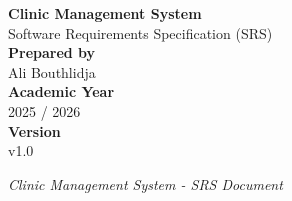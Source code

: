 \begin{titlepage}
	\centering
	
	\vspace*{2cm}
	
	{\Huge \textbf{Clinic Management System}}\\[0.5cm]
	
	{\Large Software Requirements Specification (SRS)}\\[2cm]
	
	{\large \textbf{Prepared by}}\\[0.3cm]
	Ali Bouthlidja\\[1cm]
	
	{\large \textbf{Academic Year}}\\[0.3cm]
	2025 / 2026\\[1cm]
	
	{\large \textbf{Version}}\\[0.3cm]
	v1.0\\[2cm]
	
	\vfill
	
	{\large \textit{Clinic Management System - SRS Document}}
	
\end{titlepage}